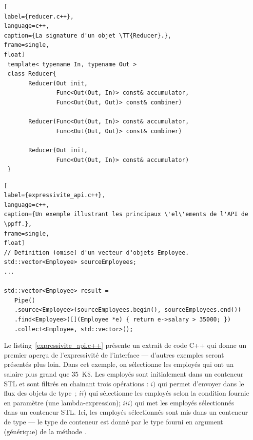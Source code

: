 




\begin{lstlisting}[
label={reducer.c++},
language=c++,
caption={La signature d'un objet \TT{Reducer}.},
frame=single,
float]
 template< typename In, typename Out >
 class Reducer{
       Reducer(Out init, 
               Func<Out(Out, In)> const& accumulator,
               Func<Out(Out, Out)> const& combiner)

       Reducer(Func<Out(Out, In)> const& accumulator,
               Func<Out(Out, Out)> const& combiner)

       Reducer(Out init, 
               Func<Out(Out, In)> const& accumulator)
 }
\end{lstlisting}


\begin{lstlisting}[
label={expressivite_api.c++},
language=c++,
caption={Un exemple illustrant les principaux \'el\'ements de l'API de \ppff.},
frame=single,
float]
// Definition (omise) d'un vecteur d'objets Employee.
std::vector<Employee> sourceEmployees;
...

std::vector<Employee> result = 
   Pipe()
   .source<Employee>(sourceEmployees.begin(), sourceEmployees.end())
   .find<Employee>([](Employee *e) { return e->salary > 35000; })
   .collect<Employee, std::vector>();
\end{lstlisting}




Le listing~\ref{expressivite_api.c++} pr\'esente un extrait de code C++ qui donne un premier aper\c{c}u de l'expressivit\'e de l'interface --- d'autres exemples seront pr\'esent\'es plus loin. Dans cet exemple, on s\'electionne les employ\'es qui ont un salaire plus grand que 35~K\$. Les employ\'es sont initialement dans un conteneur STL et sont filtr\'es en chainant trois op\'erations : $i)$  qui permet d'envoyer dans le flux des objets de type~; $ii$)  qui s\'electionne les employ\'es selon la condition fournie en param\`etre (une lambda-expression); $iii)$  qui met les employ\'es s\'electionn\'es dans un conteneur STL. Ici, les employ\'es s\'electionn\'es sont mis dans un conteneur de type  --- le type de conteneur est donn\'e par le type fourni en argument (g\'en\'erique) de la m\'ethode .




